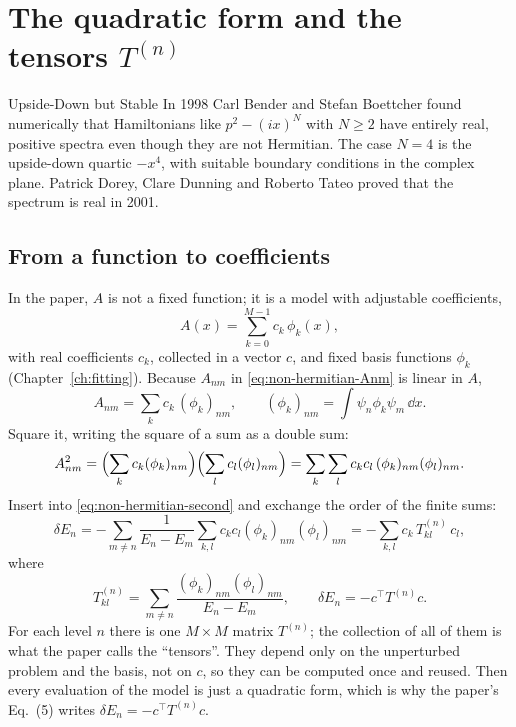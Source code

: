 \section{The quadratic form and the tensors $T^{(n)}$}\label{sec:non-hermitian-tensor}
\begin{didyouknow}{Upside-Down but Stable}
In 1998 Carl Bender and Stefan Boettcher found numerically that Hamiltonians like $p^2-(ix)^N$ with $N\ge2$ have entirely real, positive spectra even though they are not Hermitian. The case $N=4$ is the upside-down quartic $-x^4$, with suitable boundary conditions in the complex plane. Patrick Dorey, Clare Dunning and Roberto Tateo proved that the spectrum is real in 2001.
\end{didyouknow}

\subsection{From a function to coefficients}

In the paper, $A$ is not a fixed function; it is a model with adjustable coefficients,
\begin{equation}
A(x) = \sum_{k=0}^{M-1} c_k\,\phi_k(x),
\label{eq:non-hermitian-Aexpand}
\end{equation}
with real coefficients $c_k$, collected in a vector $c$, and fixed basis functions $\phi_k$ (Chapter~\ref{ch:fitting}). Because $A_{nm}$ in \eqref{eq:non-hermitian-Anm} is linear in $A$,
\begin{equation}
A_{nm} = \sum_k c_k\,(\phi_k)_{nm}, \qquad (\phi_k)_{nm}=\int\psi_n\phi_k\psi_m\,\dd x .
\end{equation}
Square it, writing the square of a sum as a double sum:
\begin{equation}
A_{nm}^2 = \Bigl(\sum_k c_k(\phi_k)_{nm}\Bigr)\Bigl(\sum_l c_l(\phi_l)_{nm}\Bigr) = \sum_{k}\sum_{l} c_kc_l\,(\phi_k)_{nm}(\phi_l)_{nm}.
\end{equation}
Insert into \eqref{eq:non-hermitian-second} and exchange the order of the finite sums:
\begin{equation}
\delta E_n = -\sum_{m\ne n}\frac{1}{E_n-E_m}\sum_{k,l}c_kc_l(\phi_k)_{nm}(\phi_l)_{nm}
= -\sum_{k,l}c_k\,T^{(n)}_{kl}\,c_l,
\end{equation}
where
\begin{equation}
\boxed{\;T^{(n)}_{kl} = \sum_{m\ne n}\frac{(\phi_k)_{nm}(\phi_l)_{nm}}{E_n-E_m}, \qquad \delta E_n = -c^\top T^{(n)} c.\;}
\label{eq:non-hermitian-tensor}
\end{equation}
For each level $n$ there is one $M\times M$ matrix $T^{(n)}$; the collection of all of them is what the paper calls the ``tensors''. They depend only on the unperturbed problem and the basis, not on $c$, so they can be computed once and reused. Then every evaluation of the model is just a quadratic form, which is why the paper's Eq.~(5) writes $\delta E_n=-c^\top T^{(n)}c$.

